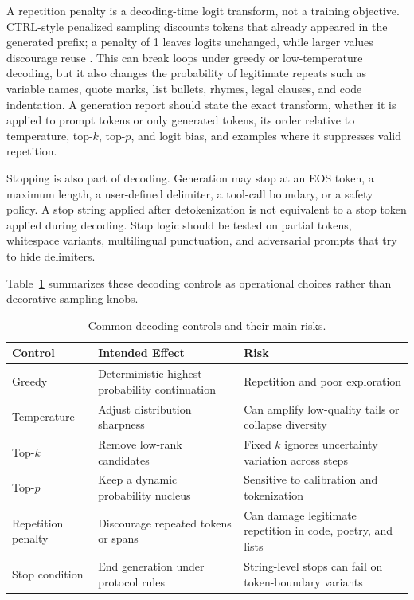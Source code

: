 A repetition penalty is a decoding-time logit transform, not a training objective. CTRL-style penalized sampling discounts tokens that already appeared in the generated prefix; a penalty of 1 leaves logits unchanged, while larger values discourage reuse \cite{keskar2019ctrl}. This can break loops under greedy or low-temperature decoding, but it also changes the probability of legitimate repeats such as variable names, quote marks, list bullets, rhymes, legal clauses, and code indentation. A generation report should state the exact transform, whether it is applied to prompt tokens or only generated tokens, its order relative to temperature, top-$k$, top-$p$, and logit bias, and examples where it suppresses valid repetition.

Stopping is also part of decoding. Generation may stop at an EOS token, a maximum length, a user-defined delimiter, a tool-call boundary, or a safety policy. A stop string applied after detokenization is not equivalent to a stop token applied during decoding. Stop logic should be tested on partial tokens, whitespace variants, multilingual punctuation, and adversarial prompts that try to hide delimiters.

Table~\ref{tab:decoding-controls} summarizes these decoding controls as operational choices rather than decorative sampling knobs.

\begin{table}[t]
\caption{Common decoding controls and their main risks.}
\label{tab:decoding-controls}
\small
\begin{tabular}{@{}p{2.6cm}p{4.3cm}p{4.7cm}@{}}
\toprule
Control & Intended Effect & Risk \\
\midrule
Greedy & Deterministic highest-probability continuation & Repetition and poor exploration \\
Temperature & Adjust distribution sharpness & Can amplify low-quality tails or collapse diversity \\
Top-$k$ & Remove low-rank candidates & Fixed $k$ ignores uncertainty variation across steps \\
Top-$p$ & Keep a dynamic probability nucleus & Sensitive to calibration and tokenization \\
Repetition penalty & Discourage repeated tokens or spans & Can damage legitimate repetition in code, poetry, and lists \\
Stop condition & End generation under protocol rules & String-level stops can fail on token-boundary variants \\
\bottomrule
\end{tabular}
\end{table}


